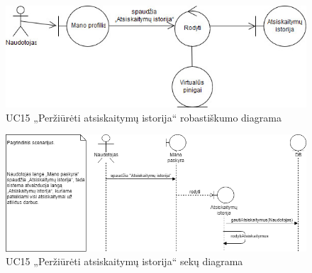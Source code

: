 \documentclass{VUMIFPSbakalaurinis}
\begin{document}
\begin{figure}[H]
	\centering
	\includegraphics[scale=0.6]{img/Robustness/UC15}
	\caption{UC15 „Peržiūrėti atsiskaitymų istorija“ robastiškumo diagrama}
	\label{img:uc15rob}
\end{figure}

\begin{figure}[H]
	\centering
	\includegraphics[scale=0.6]{img/Sequence/SD15}
	\caption{UC15 „Peržiūrėti atsiskaitymų istorija“ sekų diagrama}
	\label{img:uc15seq}
\end{figure}
\end{document}
